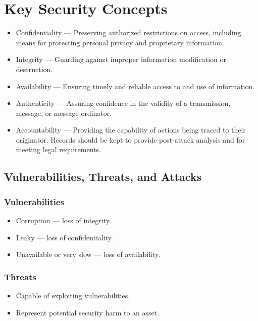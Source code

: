 \section{Key Security Concepts}

\begin{itemize}
	\item Confidentiality --- Preserving authorized restrictions on access, including means for protecting personal privacy and proprietary information.
	\item Integrity --- Guarding against improper information modification or destruction.
	\item Availability --- Ensuring timely and reliable access to and use of information.
	\item Authenticity --- Assuring confidence in the validity of a transmission, message, or message ordinator.
	\item Accountability --- Providing the capability of actions being traced to their originator. Records should be kept to provide post-attack analysis and for meeting legal requirements.
\end{itemize}

\subsection{Vulnerabilities, Threats, and Attacks}
\subsubsection{Vulnerabilities}

\begin{itemize}
	\item Corruption --- loss of integrity.
	\item Leaky --- loss of confidentiality.
	\item Unavailable or very slow --- loss of availability.
\end{itemize}


\subsubsection{Threats}

\begin{itemize}
	\item Capable of exploiting vulnerabilities.
	\item Represent potential security harm to an asset.
\end{itemize}


